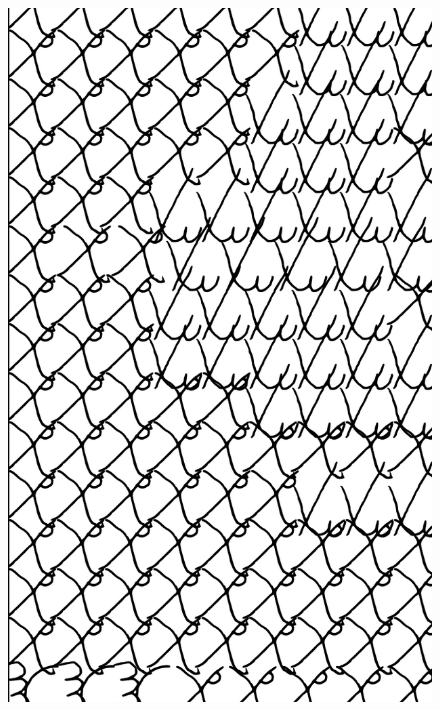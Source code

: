 \makeatletter\@openrightfalse
\movetooddpage
\begin{absolutelynopagebreak}
\begin{vplace}
\begin{figure}[H]
\begin{adjustwidth}{-0.99cm}{}
  \centering
  \vspace*{-1.97cm}
  \hspace*{-0.70cm}
  \includegraphics[width=115mm]{./imgs/img5.pdf}  
  \hfill
\end{adjustwidth}

\thispagestyle{empty}

\end{figure}
\end{vplace}

\end{absolutelynopagebreak}


